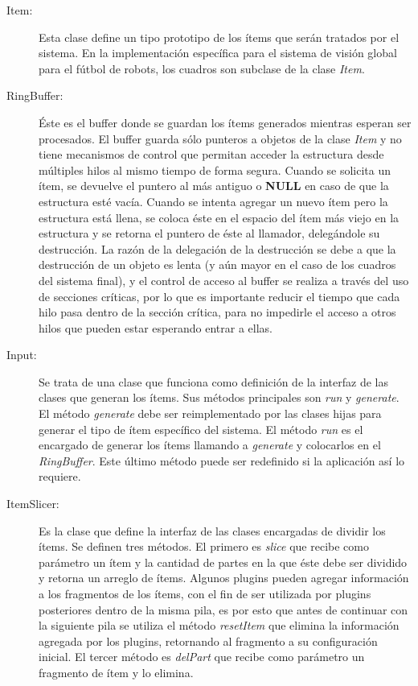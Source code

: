 \begin{description}

	\item[Item:] Esta clase define un tipo prototipo de los ítems que serán
		tratados por el sistema. En la implementación específica para el
		sistema de visión global para el fútbol de robots, los cuadros
		son subclase de la clase \emph{Item}.

	\item[RingBuffer:] Éste es el buffer donde se guardan los ítems
		generados mientras esperan ser procesados. El buffer guarda sólo
		punteros a objetos de la clase \emph{Item} y no tiene mecanismos
		de control que permitan acceder la estructura desde múltiples
		hilos al mismo tiempo de forma segura. Cuando se solicita un
		ítem, se devuelve el puntero al más antiguo o \textbf{NULL} en
		caso de que la estructura esté vacía. Cuando se intenta agregar
		un nuevo ítem pero la estructura está llena, se coloca éste en
		el espacio del ítem más viejo en la estructura y se retorna el
		puntero de éste al llamador, delegándole su destrucción. La
		razón de la delegación de la destrucción se debe a que la
		destrucción de un objeto es lenta (y aún mayor en el caso de los
		cuadros del sistema final), y el control de acceso al buffer se
		realiza a través del uso de secciones críticas, por lo que es
		importante reducir el tiempo que cada hilo pasa dentro de la
		sección crítica, para no impedirle el acceso a otros hilos que
		pueden estar esperando entrar a ellas.

	\item[Input:] Se trata de una clase que funciona como definición de la
		interfaz de las clases que generan los ítems. Sus métodos
		principales son \emph{run} y \emph{generate}. El método
		\emph{generate} debe ser reimplementado por las clases hijas
		para generar el tipo de ítem específico del sistema. El método
		\emph{run} es el encargado de generar los ítems llamando a
		\emph{generate} y colocarlos en el \emph{RingBuffer}. Este
		último método puede ser redefinido si la aplicación así lo
		requiere.

	\item[ItemSlicer:] Es la clase que define la interfaz de las clases
		encargadas de dividir los ítems. Se definen tres métodos. El
		primero es \emph{slice} que recibe como parámetro un ítem y la
		cantidad de partes en la que éste debe ser dividido y retorna un
		arreglo de ítems. Algunos plugins pueden agregar información a
		los fragmentos de los ítems, con el fin de ser utilizada por
		plugins posteriores dentro de la misma pila, es por esto que
		antes de continuar con la siguiente pila se utiliza el método
		\emph{resetItem} que elimina la información agregada por los
		plugins, retornando al fragmento a su configuración inicial. El
		tercer método es \emph{delPart} que recibe como parámetro un
		fragmento de ítem y lo elimina.


\end{description}
